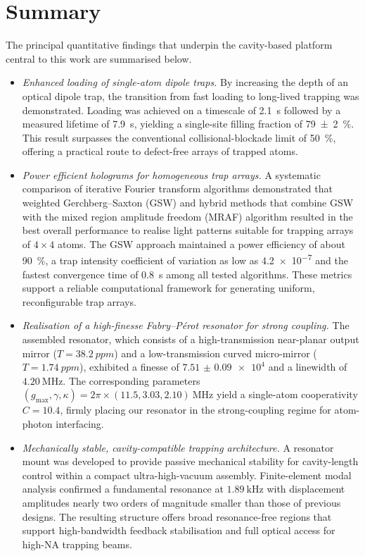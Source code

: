 \documentclass[../Thesis-IJspeert.tex]{subfiles}
\begin{document}
\section{Summary}
The principal quantitative findings that underpin the cavity-based platform central to this work are summarised below.
\begin{itemize}[leftmargin=*, labelsep=1em]
\item \emph{Enhanced loading of single-atom dipole traps.}  
By increasing the depth of an optical dipole trap, the transition from fast loading to long-lived trapping was demonstrated. Loading was achieved on a timescale of \SI{2.1}{\second} followed by a measured lifetime of \SI{7.9}{\second}, yielding a single-site filling fraction of \SI{79\pm 2}{\percent}.  This result surpasses the conventional collisional-blockade limit of \SI{50}{\percent}, offering a practical route to defect-free arrays of trapped atoms.

\item \emph{Power efficient holograms for homogeneous trap arrays.}  
A systematic comparison of iterative Fourier transform algorithms demonstrated that weighted Gerchberg--Saxton (GSW) and hybrid methods that combine GSW with the mixed region amplitude freedom (MRAF) algorithm resulted in the best overall performance to realise light patterns suitable for trapping arrays of $4\times4$ atoms. The GSW approach maintained a power efficiency of about \SI{90}{\percent}, a trap intensity coefficient of variation as low as \num{4.2e-7} and the fastest convergence time of \SI{0.8}{\second} among all tested algorithms. These metrics support a reliable computational framework for generating uniform, reconfigurable trap arrays.

\item \emph{Realisation of a high-finesse Fabry--Pérot resonator for strong coupling.}  
The assembled resonator, which consists of a high-transmission near-planar output mirror ($T=\SI{38.2}{ppm}$) and a low-transmission curved micro-mirror ($T=\SI{1.74}{ppm}$), exhibited a finesse of $\num{7.51(9)e4}$ and a linewidth of $\SI{4.20}{\mega\hertz}$. The corresponding parameters $(g_{\mathrm{max}},\gamma,\kappa)=2\pi\times(11.5,3.03,2.10)~\mathrm{MHz}$ yield a single-atom cooperativity $C = 10.4$, firmly placing our resonator in the strong-coupling regime for atom-photon interfacing.

\item \emph{Mechanically stable, cavity-compatible trapping architecture.}  
A resonator mount was developed to provide passive mechanical stability for cavity-length control within a compact ultra-high-vacuum assembly. Finite-element modal analysis confirmed a fundamental resonance at $\SI{1.89}{\kilo\hertz}$ with displacement amplitudes nearly two orders of magnitude smaller than those of previous designs. The resulting structure offers broad resonance-free regions that support high-bandwidth feedback stabilisation and full optical access for high-NA trapping beams.


\end{itemize}
\end{document}
